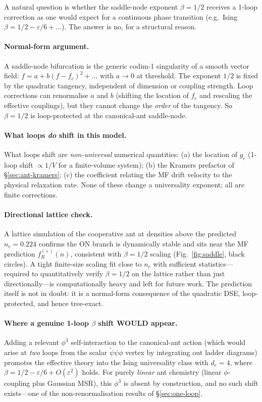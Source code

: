 \documentclass[10pt,a4paper,twocolumn]{article}
\newcommand{\psit}{\tilde\psi}
\theoremstyle{definition}
\begin{document}
A natural question is whether the saddle-node exponent $\beta =
1/2$ receives a 1-loop correction as one would expect for a
continuous phase transition (e.g.\ Ising $\beta = 1/2 -
\varepsilon/6 + \ldots$).  The answer is no, for a structural
reason.

\paragraph{Normal-form argument.}
A saddle-node bifurcation is the generic codim-1 singularity of
a smooth vector field: $\dot f = a + b(f - f_c)^2 + \ldots$
with $a \to 0$ at threshold.  The exponent $1/2$ is fixed by
the quadratic tangency, independent of dimension or coupling
strength.  Loop corrections can renormalise $a$ and $b$
(shifting the location of $f_c$ and rescaling the effective
couplings), but they cannot change the \emph{order} of the
tangency.  So $\beta = 1/2$ is loop-protected at the
canonical-ant saddle-node.

\paragraph{What loops \emph{do} shift in this model.}
What loops shift are \emph{non-universal} numerical quantities:
(a) the location of $g_c$ (1-loop shift $\propto 1/V$ for a
finite-volume system); (b) the Kramers prefactor of
\S\ref{sec:ant-kramers}; (c) the coefficient relating the MF
drift velocity to the physical relaxation rate.  None of these
change a universality exponent; all are finite corrections.

\paragraph{Directional lattice check.}
A lattice simulation of the cooperative ant at densities above
the predicted $n_c = 0.224$ confirms the ON branch is
dynamically stable and sits near the MF prediction
$f_R^{(+)}(n)$, consistent with $\beta = 1/2$ scaling
(Fig.~\ref{fig:saddle}, black circles).  A tight finite-size
scaling fit close to $n_c$ with sufficient
statistics---required to quantitatively verify $\beta = 1/2$ on
the lattice rather than just directionally---is computationally
heavy and left for future work.  The prediction itself is not
in doubt: it is a normal-form consequence of the quadratic DSE,
loop-protected, and hence tree-exact.

\paragraph{Where a genuine 1-loop $\beta$ shift WOULD appear.}
Adding a relevant $\phi^3$ self-interaction to the canonical-ant
action (which would arise at \emph{two} loops from the scalar
$\psit\psi\phi$ vertex by integrating out ladder diagrams)
promotes the effective theory into the Ising universality class
with $d_c = 4$, where $\beta = 1/2 - \varepsilon/6 + O(\varepsilon^2)$
holds.  For purely \emph{linear} ant chemistry (linear $\phi$-
coupling plus Gaussian MSR), this $\phi^3$ is absent by
construction, and no such shift exists---one of the
non-renormalisation results of \S\ref{sec:one-loop}.
\end{document}
